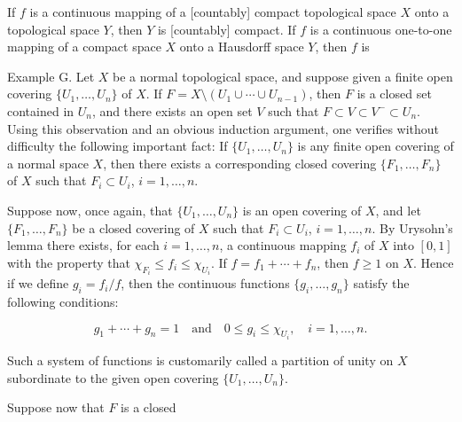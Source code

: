 If $f$ is a continuous mapping of a [countably] compact topological space $X$ onto a topological space $Y$, then $Y$ is [countably] compact. If $f$ is a continuous one-to-one mapping of a compact space $X$ onto a Hausdorff space $Y$, then $f$ is

Example G. Let $X$ be a normal topological space, and suppose given a finite open covering $\{U_1, \ldots, U_n\}$ of $X$. If $F = X \setminus (U_1 \cup \cdots \cup U_{n-1})$, then $F$ is a closed set contained in $U_n$, and there exists an open set $V$ such that $F \subset V \subset V^- \subset U_n$. Using this observation and an obvious induction argument, one verifies without difficulty the following important fact: If $\{U_1, \ldots, U_n\}$ is any finite open covering of a normal space $X$, then there exists a corresponding closed covering $\{F_1, \ldots, F_n\}$ of $X$ such that $F_i \subset U_i$, $i = 1, \ldots, n$.

Suppose now, once again, that $\{U_1, \ldots, U_n\}$ is an open covering of $X$, and let $\{F_1, \ldots, F_n\}$ be a closed covering of $X$ such that $F_i \subset U_i$, $i = 1, \ldots, n$. By Urysohn’s lemma there exists, for each $i = 1, \ldots, n$, a continuous mapping $f_i$ of $X$ into $[0, 1]$ with the property that $\chi_{F_i} \leq f_i \leq \chi_{U_i}$. If $f = f_1 + \cdots + f_n$, then $f \geq 1$ on $X$. Hence if we define $g_i = f_i/f$, then the continuous functions $\{g_i, \ldots, g_n\}$ satisfy the following conditions:

$$g_1 + \cdots + g_n = 1 \quad \text{and} \quad 0 \leq g_i \leq \chi_{U_i}, \quad i = 1, \ldots, n.$$

Such a system of functions is customarily called a partition of unity on $X$ subordinate to the given open covering $\{U_1, \ldots, U_n\}$.

Suppose now that $F$ is a closed

